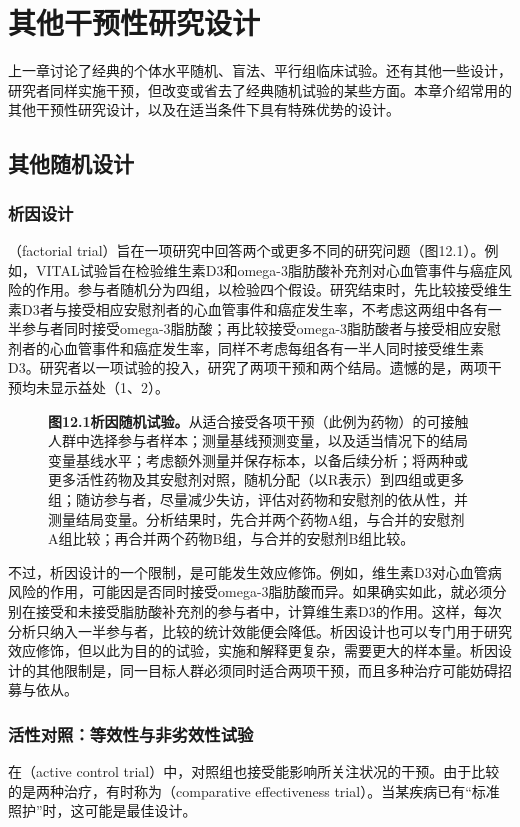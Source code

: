 \chapter{其他干预性研究设计}
\begingroup\setlength{\tabcolsep}{4pt}
上一章讨论了经典的个体水平随机、盲法、平行组临床试验。还有其他一些设计，研究者同样实施干预，但改变或省去了经典随机试验的某些方面。本章介绍常用的其他干预性研究设计，以及在适当条件下具有特殊优势的设计。

\section{其他随机设计}
\subsection{析因设计}
（factorial trial）旨在一项研究中回答两个或更多不同的研究问题（图12.1）。例如，VITAL试验旨在检验维生素D3和omega-3脂肪酸补充剂对心血管事件与癌症风险的作用。参与者随机分为四组，以检验四个假设。研究结束时，先比较接受维生素D3者与接受相应安慰剂者的心血管事件和癌症发生率，不考虑这两组中各有一半参与者同时接受omega-3脂肪酸；再比较接受omega-3脂肪酸者与接受相应安慰剂者的心血管事件和癌症发生率，同样不考虑每组各有一半人同时接受维生素D3。研究者以一项试验的投入，研究了两项干预和两个结局。遗憾的是，两项干预均未显示益处（1、2）。

\begin{figure}[htbp]\centering\chTwelveFactorial
\caption*{\textbf{图12.1\quad 析因随机试验。}从适合接受各项干预（此例为药物）的可接触人群中选择参与者样本；测量基线预测变量，以及适当情况下的结局变量基线水平；考虑额外测量并保存标本，以备后续分析；将两种或更多活性药物及其安慰剂对照，随机分配（以R表示）到四组或更多组；随访参与者，尽量减少失访，评估对药物和安慰剂的依从性，并测量结局变量。分析结果时，先合并两个药物A组，与合并的安慰剂A组比较；再合并两个药物B组，与合并的安慰剂B组比较。}
\end{figure}
不过，析因设计的一个限制，是可能发生效应修饰。例如，维生素D3对心血管病风险的作用，可能因是否同时接受omega-3脂肪酸而异。如果确实如此，就必须分别在接受和未接受脂肪酸补充剂的参与者中，计算维生素D3的作用。这样，每次分析只纳入一半参与者，比较的统计效能便会降低。析因设计也可以专门用于研究效应修饰，但以此为目的的试验，实施和解释更复杂，需要更大的样本量。析因设计的其他限制是，同一目标人群必须同时适合两项干预，而且多种治疗可能妨碍招募与依从。

\subsection{活性对照：等效性与非劣效性试验}
在（active control trial）中，对照组也接受能影响所关注状况的干预。由于比较的是两种治疗，有时称为（comparative effectiveness trial）。当某疾病已有“标准照护”时，这可能是最佳设计。

